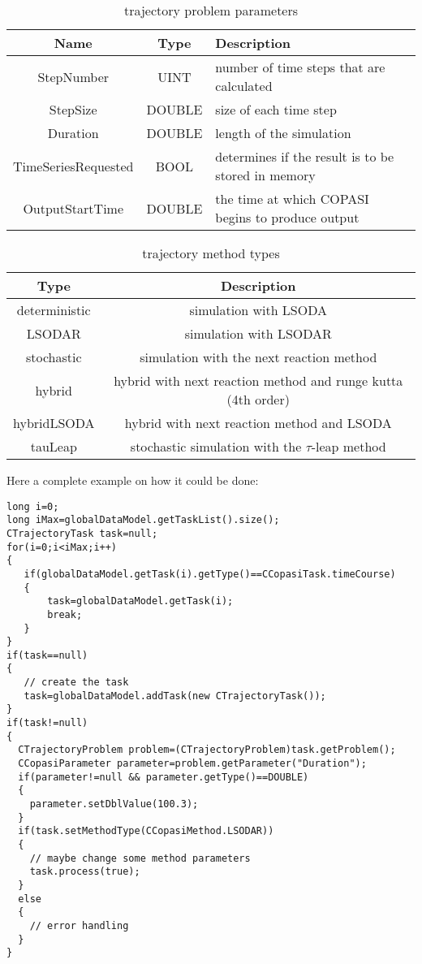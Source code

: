 \documentclass[a4,10pt]{article}
\begin{document}
\small{
\begin{table}[ht]
\begin{tabular}{c|c|l}
Name & Type & Description \\ \hline \hline
StepNumber & UINT & number of time steps that are calculated \\ \hline
StepSize & DOUBLE & size of each time step \\ \hline
Duration & DOUBLE & length of the simulation \\ \hline
TimeSeriesRequested & BOOL & determines if the result is to be stored in memory \\ \hline
OutputStartTime & DOUBLE & the time at which COPASI begins to produce output \\ \hline
\end{tabular}
\label{TrajectoryProblemParameters}
\caption{trajectory problem parameters}
\end{table}
}
\begin{table}[ht]
\begin{tabular}{c|c}
Type &  Description \\ \hline \hline
deterministic  & simulation with LSODA \\ \hline
LSODAR  &  simulation with LSODAR \\ \hline
stochastic &  simulation with the next reaction method \\ \hline
hybrid &  hybrid with next reaction method and runge kutta (4th order)\\ \hline
hybridLSODA & hybrid with next reaction method and LSODA \\ \hline
tauLeap & stochastic simulation with the $\tau$-leap method \\ \hline
\end{tabular}
\label{TrajectoryMethods}
\caption{trajectory method types}
\end{table}

Here a complete example on how it could be done:

\begin{lstlisting}
long i=0;
long iMax=globalDataModel.getTaskList().size();
CTrajectoryTask task=null;
for(i=0;i<iMax;i++)
{
   if(globalDataModel.getTask(i).getType()==CCopasiTask.timeCourse)
   {
       task=globalDataModel.getTask(i);
       break;
   }
}
if(task==null)
{
   // create the task
   task=globalDataModel.addTask(new CTrajectoryTask());
}
if(task!=null)
{
  CTrajectoryProblem problem=(CTrajectoryProblem)task.getProblem();
  CCopasiParameter parameter=problem.getParameter("Duration");
  if(parameter!=null && parameter.getType()==DOUBLE)
  {
    parameter.setDblValue(100.3);
  }
  if(task.setMethodType(CCopasiMethod.LSODAR))
  {
    // maybe change some method parameters
    task.process(true);
  }
  else
  {
    // error handling
  }
}
\end{lstlisting}
\end{document}
